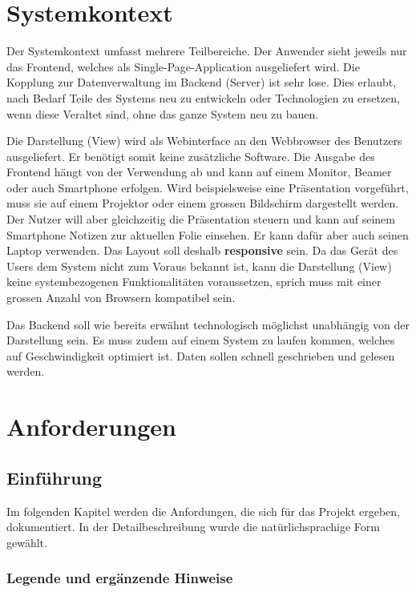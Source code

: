 \section{Systemkontext}
\label{sec:systemkontext}
Der Systemkontext umfasst mehrere Teilbereiche. Der Anwender sieht jeweils nur das Frontend, welches als Single-Page-Application ausgeliefert wird. Die Kopplung zur Datenverwaltung im Backend (Server) ist sehr lose. Dies erlaubt, nach Bedarf Teile des Systems neu zu entwickeln oder Technologien zu ersetzen, wenn diese Veraltet sind, ohne das ganze System neu zu bauen. 

Die Darstellung (View) wird als Webinterface an den Webbrowser des Benutzers ausgeliefert. Er benötigt somit keine zusätzliche Software. Die Ausgabe des Frontend hängt von der Verwendung ab und kann auf einem Monitor, Beamer oder auch Smartphone erfolgen. Wird beispielsweise eine Präsentation vorgeführt, muss sie auf einem Projektor oder einem grossen Bildschirm dargestellt werden. Der Nutzer will aber gleichzeitig die Präsentation steuern und kann auf seinem Smartphone Notizen zur aktuellen Folie einsehen. Er kann dafür aber auch seinen Laptop verwenden. Das Layout soll deshalb \textbf{responsive} sein. Da das Gerät des Users dem System nicht zum Voraus bekannt ist, kann die Darstellung (View) keine systembezogenen Funktionalitäten voraussetzen, sprich muss mit einer grossen Anzahl von Browsern kompatibel sein.

Das Backend soll wie bereits erwähnt technologisch möglichst unabhängig von der Darstellung sein. Es muss zudem auf einem System zu laufen kommen, welches auf Geschwindigkeit optimiert ist. Daten sollen schnell geschrieben und gelesen werden. 

\section{Anforderungen}
\label{sec:anforderungen}

\subsection{Einführung}
Im folgenden Kapitel werden die Anfordungen, die sich für das Projekt ergeben, dokumentiert. In der Detailbeschreibung wurde die natürlichsprachige Form gewählt.

\subsubsection{Legende und ergänzende Hinweise}

